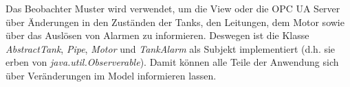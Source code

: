 \documentclass[parskip=full]{scrartcl}
\begin{document}
Das Beobachter Muster wird verwendet, um die View oder die OPC UA Server über Änderungen in den Zuständen der Tanks, den Leitungen, dem Motor sowie über
das Auslösen von Alarmen zu informieren. Deswegen ist die Klasse \emph{AbstractTank}, \emph{Pipe}, \emph{Motor} und \emph{TankAlarm} als Subjekt implementiert
(d.h. sie erben von \emph{java.util.Observerable}). Damit können alle Teile der Anwendung sich über Veränderungen im Model informieren lassen.

\pagebreak
{}
{}
\listoffigures
\end{document}

